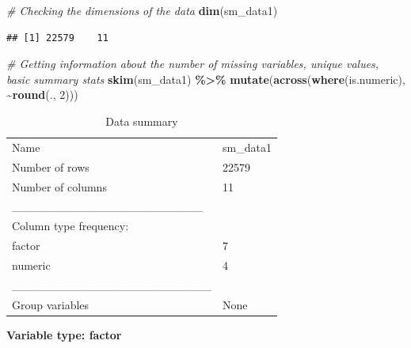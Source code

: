 \documentclass[
]{article}
\newenvironment{Shaded}{\begin{snugshade}}{\end{snugshade}}
\newcommand{\CommentTok}[1]{\textcolor[rgb]{0.56,0.35,0.01}{\textit{#1}}}
\newcommand{\DecValTok}[1]{\textcolor[rgb]{0.00,0.00,0.81}{#1}}
\newcommand{\FunctionTok}[1]{\textcolor[rgb]{0.13,0.29,0.53}{\textbf{#1}}}
\newcommand{\NormalTok}[1]{#1}
\newcommand{\SpecialCharTok}[1]{\textcolor[rgb]{0.81,0.36,0.00}{\textbf{#1}}}
\begin{document}
\begin{Shaded}
\begin{Highlighting}[]
\CommentTok{\# Checking the dimensions of the data}
\FunctionTok{dim}\NormalTok{(sm\_data1)}
\end{Highlighting}
\end{Shaded}

\begin{verbatim}
## [1] 22579    11
\end{verbatim}

\begin{Shaded}
\begin{Highlighting}[]
\CommentTok{\# Getting information about the number of missing variables, unique values, basic summary stats}
\FunctionTok{skim}\NormalTok{(sm\_data1) }\SpecialCharTok{\%\textgreater{}\%}
  \FunctionTok{mutate}\NormalTok{(}\FunctionTok{across}\NormalTok{(}\FunctionTok{where}\NormalTok{(is.numeric), }\SpecialCharTok{\textasciitilde{}}\FunctionTok{round}\NormalTok{(., }\DecValTok{2}\NormalTok{)))}
\end{Highlighting}
\end{Shaded}

\begin{longtable}[]{@{}ll@{}}
\caption{Data summary}\tabularnewline
\toprule\noalign{}
\endfirsthead
\endhead
\bottomrule\noalign{}
\endlastfoot
Name & sm\_data1 \\
Number of rows & 22579 \\
Number of columns & 11 \\
\_\_\_\_\_\_\_\_\_\_\_\_\_\_\_\_\_\_\_\_\_\_\_ & \\
Column type frequency: & \\
factor & 7 \\
numeric & 4 \\
\_\_\_\_\_\_\_\_\_\_\_\_\_\_\_\_\_\_\_\_\_\_\_\_ & \\
Group variables & None \\
\end{longtable}

\textbf{Variable type: factor}
\end{document}
